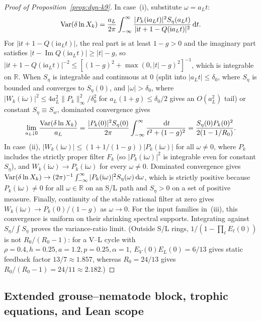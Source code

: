 \begin{proof}[Proof of Proposition~{\upshape\ref{prop:dyn-k9}}]
In case~(i), substitute $\omega = a_L t$:
\[
\operatorname{Var}(\delta\ln X_k) = \frac{a_L}{2\pi}\int_{-\infty}^\infty \frac{|P_k(\mathrm{i}a_L t)|^2 S_\eta(a_L t)}{|\mathrm{i}t + 1 - Q(\mathrm{i}a_L t)|^2}\,\mathrm{d} t.
\]
For $|\mathrm{i}t + 1 - Q(\mathrm{i}a_L t)|$, the real part is at least $1 - g > 0$ and the imaginary part satisfies $|t - \operatorname{Im} Q(\mathrm{i}a_L t)| \ge |t| - g$, so $|\mathrm{i}t + 1 - Q(\mathrm{i}a_L t)|^{-2} \le [(1 - g)^2 + \max(0, |t| - g)^2]^{-1}$, which is integrable on $\mathbb{R}$. When $S_\eta$ is integrable and continuous at $0$ (split into $|a_L t| \le \delta_0$, where $S_\eta$ is bounded and converges to $S_\eta(0)$, and $|\omega| > \delta_0$, where $|W_k(\mathrm{i}\omega)|^2\leq4a_L^2\|P_k\|_\infty^2/\delta_0^2$ for $a_L(1+g)\leq\delta_0/2$ gives an $O(a_L^2)$ tail) or constant $S_\eta \equiv S_w$, dominated convergence gives
\[
\lim_{a_L \downarrow 0} \frac{\operatorname{Var}(\delta\ln X_k)}{a_L} = \frac{|P_k(0)|^2 S_\eta(0)}{2\pi}\int_{-\infty}^\infty \frac{\,\mathrm{d} t}{t^2 + (1 - g)^2} = \frac{S_\eta(0)P_k(0)^2}{2(1 - 1/R_0)}.
\]
In case~(ii), $|W_k(\mathrm{i}\omega)| \le (1 + 1/(1 - g))|P_k(\mathrm{i}\omega)|$ for all $\omega \ne 0$, where $P_k$ includes the strictly proper filter $F_k$ (so $|P_k(\mathrm{i}\omega)|^2$ is integrable even for constant $S_\eta$), and $W_k(\mathrm{i}\omega) \to P_k(\mathrm{i}\omega)$ for every $\omega \ne 0$. Dominated convergence gives $\operatorname{Var}(\delta\ln X_k) \to (2\pi)^{-1}\int_{-\infty}^\infty |P_k(\mathrm{i}\omega)|^2 S_\eta(\omega)\,\mathrm{d}\omega$, which is strictly positive because $P_k(\mathrm{i}\omega) \ne 0$ for all $\omega \in \mathbb{R}$ on an S/L path and $S_\eta > 0$ on a set of positive measure. Finally, continuity of the stable rational filter at zero gives $W_k(\mathrm{i}\omega)\to P_k(0)/(1-g)$ as $\omega\to0$. For the input families in~(iii), this convergence is uniform on their shrinking spectral supports. Integrating against $S_\eta/\int S_\eta$ proves the variance-ratio limit. (Outside S/L rings, $1/(1 - \prod_\ell E_\ell(0))$ is not $R_0/(R_0 - 1)$: for a V--L cycle with $\rho = 0.4, h = 0.25, a = 1.2, p = 0.25, \alpha = 1$, $E_V(0)E_L(0) = 6/13$ gives static feedback factor $13/7 \approx 1.857$, whereas $R_0 = 24/13$ gives $R_0/(R_0 - 1) = 24/11 \approx 2.182$.)
\end{proof}

\subsection{Extended grouse--nematode block, trophic equations, and Lean scope}\label{subsec:app-dyn-models}

